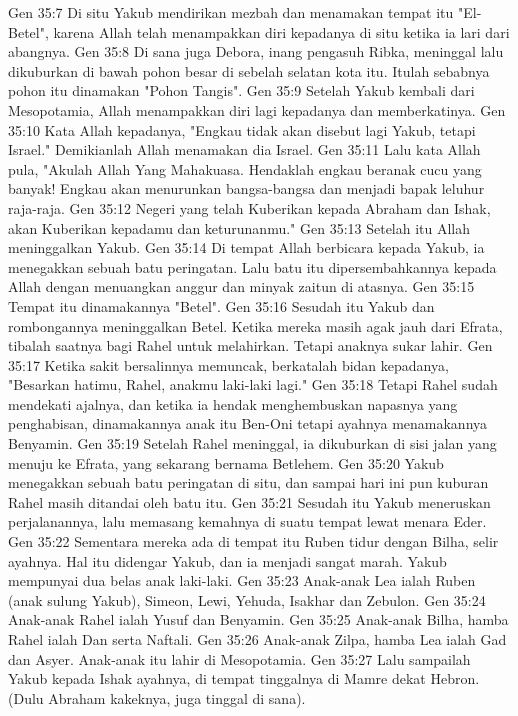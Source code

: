 Gen 35:7  Di situ Yakub mendirikan mezbah dan menamakan tempat itu "El-Betel", karena Allah telah menampakkan diri kepadanya di situ ketika ia lari dari abangnya.
Gen 35:8  Di sana juga Debora, inang pengasuh Ribka, meninggal lalu dikuburkan di bawah pohon besar di sebelah selatan kota itu. Itulah sebabnya pohon itu dinamakan "Pohon Tangis".
Gen 35:9  Setelah Yakub kembali dari Mesopotamia, Allah menampakkan diri lagi kepadanya dan memberkatinya.
Gen 35:10  Kata Allah kepadanya, "Engkau tidak akan disebut lagi Yakub, tetapi Israel." Demikianlah Allah menamakan dia Israel.
Gen 35:11  Lalu kata Allah pula, "Akulah Allah Yang Mahakuasa. Hendaklah engkau beranak cucu yang banyak! Engkau akan menurunkan bangsa-bangsa dan menjadi bapak leluhur raja-raja.
Gen 35:12  Negeri yang telah Kuberikan kepada Abraham dan Ishak, akan Kuberikan kepadamu dan keturunanmu."
Gen 35:13  Setelah itu Allah meninggalkan Yakub.
Gen 35:14  Di tempat Allah berbicara kepada Yakub, ia menegakkan sebuah batu peringatan. Lalu batu itu dipersembahkannya kepada Allah dengan menuangkan anggur dan minyak zaitun di atasnya.
Gen 35:15  Tempat itu dinamakannya "Betel".
Gen 35:16  Sesudah itu Yakub dan rombongannya meninggalkan Betel. Ketika mereka masih agak jauh dari Efrata, tibalah saatnya bagi Rahel untuk melahirkan. Tetapi anaknya sukar lahir.
Gen 35:17  Ketika sakit bersalinnya memuncak, berkatalah bidan kepadanya, "Besarkan hatimu, Rahel, anakmu laki-laki lagi."
Gen 35:18  Tetapi Rahel sudah mendekati ajalnya, dan ketika ia hendak menghembuskan napasnya yang penghabisan, dinamakannya anak itu Ben-Oni tetapi ayahnya menamakannya Benyamin.
Gen 35:19  Setelah Rahel meninggal, ia dikuburkan di sisi jalan yang menuju ke Efrata, yang sekarang bernama Betlehem.
Gen 35:20  Yakub menegakkan sebuah batu peringatan di situ, dan sampai hari ini pun kuburan Rahel masih ditandai oleh batu itu.
Gen 35:21  Sesudah itu Yakub meneruskan perjalanannya, lalu memasang kemahnya di suatu tempat lewat menara Eder.
Gen 35:22  Sementara mereka ada di tempat itu Ruben tidur dengan Bilha, selir ayahnya. Hal itu didengar Yakub, dan ia menjadi sangat marah. Yakub mempunyai dua belas anak laki-laki.
Gen 35:23  Anak-anak Lea ialah Ruben (anak sulung Yakub), Simeon, Lewi, Yehuda, Isakhar dan Zebulon.
Gen 35:24  Anak-anak Rahel ialah Yusuf dan Benyamin.
Gen 35:25  Anak-anak Bilha, hamba Rahel ialah Dan serta Naftali.
Gen 35:26  Anak-anak Zilpa, hamba Lea ialah Gad dan Asyer. Anak-anak itu lahir di Mesopotamia.
Gen 35:27  Lalu sampailah Yakub kepada Ishak ayahnya, di tempat tinggalnya di Mamre dekat Hebron. (Dulu Abraham kakeknya, juga tinggal di sana).
